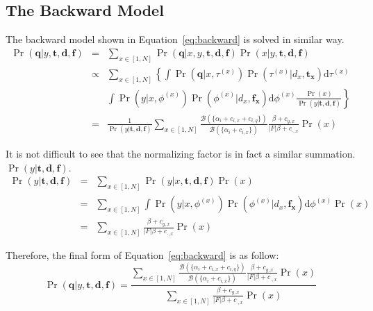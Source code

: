 \subsection{The Backward Model}\label{ss:backward-model}
The backward model shown in Equation~\eqref{eq:backward} is solved in similar way.
\begin{eqnarray}
  \Pr(\mathbf{q}|y, \mathbf{t}, \mathbf{d}, \mathbf{f}) 
  &=& \sum_{x \in [1, N]} \Pr(\mathbf{q}|x, y, \mathbf{t}, \mathbf{d}, \mathbf{f}) \Pr(x|y, \mathbf{t}, \mathbf{d}, \mathbf{f}) \nonumber\\
  &\propto& \sum_{x \in [1, N]} \left\{ \int \Pr(\mathbf{q}|x, \tau^{(x)}) \Pr(\tau^{(x)}|d_x, \mathbf{t_x}) \mathrm{d}\tau^{(x)} \right. \nonumber\\
  && \left. \int \Pr(y| x, \phi^{(x)}) \Pr(\phi^{(x)}|d_x, \mathbf{f_x})\mathrm{d}\phi^{(x)} \frac{\Pr(x)}{\Pr(y|\mathbf{t}, \mathbf{d}, \mathbf{f})} \right\} \nonumber\\
  &=& \frac{1}{\Pr(y|\mathbf{t}, \mathbf{d}, \mathbf{f})} \sum_{x \in [1, N]} \frac{\mathcal{B}(\{\alpha_i + c_{i,x} + c_{i,q} \})}{\mathcal{B}(\{\alpha_i + c_{i,x} \})} \frac{\beta + c_{y,x}}{|F|\beta + c_{\cdot,x}} \Pr(x) \nonumber
\end{eqnarray}

It is not difficult to see that the normalizing factor is in fact a similar summation.
$\Pr(y|\mathbf{t}, \mathbf{d}, \mathbf{f})$.
\begin{eqnarray}
  \Pr(y|\mathbf{t}, \mathbf{d}, \mathbf{f})
  &=& \sum_{x \in [1, N]} \Pr(y|x, \mathbf{t}, \mathbf{d}, \mathbf{f}) \Pr(x) \nonumber\\
  &=& \sum_{x \in [1, N]} \int \Pr(y|x, \phi^{(x)}) \Pr(\phi^{(x)}|d_x, \mathbf{f_x}) \mathrm{d}\phi^{(x)} \Pr(x) \nonumber\\
  &=& \sum_{x \in [1, N]} \frac{\beta + c_{y,x}}{|F|\beta + c_{\cdot,x}} \Pr(x) \nonumber
\end{eqnarray}

Therefore, the final form of Equation~\eqref{eq:backward} is as follow:
\begin{equation}\label{eq:backward-solution}
  \Pr(\mathbf{q}|y, \mathbf{t}, \mathbf{d}, \mathbf{f}) = 
  \frac{\sum_{x \in [1, N]} \frac{\mathcal{B}(\{\alpha_i + c_{i,x} + c_{i,q} \})}{\mathcal{B}(\{\alpha_i + c_{i,x} \})} \frac{\beta + c_{y,x}}{|F|\beta + c_{\cdot,x}} \Pr(x)}
  {\sum_{x \in [1, N]} \frac{\beta + c_{y,x}}{|F|\beta + c_{\cdot,x}} \Pr(x)}
\end{equation}

